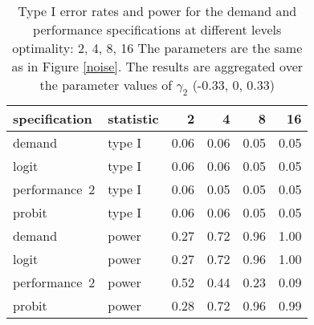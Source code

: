 \begin{table}[ht]
\centering
\begingroup\footnotesize
\begin{tabular}{llrrrr}
  \hline
specification & statistic & 2 & 4 & 8 & 16 \\ 
  \hline
demand & type I & 0.06 & 0.06 & 0.05 & 0.05 \\ 
  logit & type I & 0.06 & 0.06 & 0.05 & 0.05 \\ 
  performance~2 & type I & 0.06 & 0.05 & 0.05 & 0.05 \\ 
  probit & type I & 0.06 & 0.06 & 0.05 & 0.05 \\ 
  demand & power & 0.27 & 0.72 & 0.96 & 1.00 \\ 
  logit & power & 0.27 & 0.72 & 0.96 & 1.00 \\ 
  performance~2 & power & 0.52 & 0.44 & 0.23 & 0.09 \\ 
  probit & power & 0.28 & 0.72 & 0.96 & 0.99 \\ 
   \hline
\end{tabular}
\endgroup
\caption{Type I error rates and power for the demand and
             performance specifications at different levels optimality: 
             2, 4, 8, 16 The parameters are the same as in Figure      
             \ref{noise}. The results are aggregated over the parameter              values of $\gamma_2$ (-0.33, 0, 0.33)} 
\label{noise-table}
\end{table}
